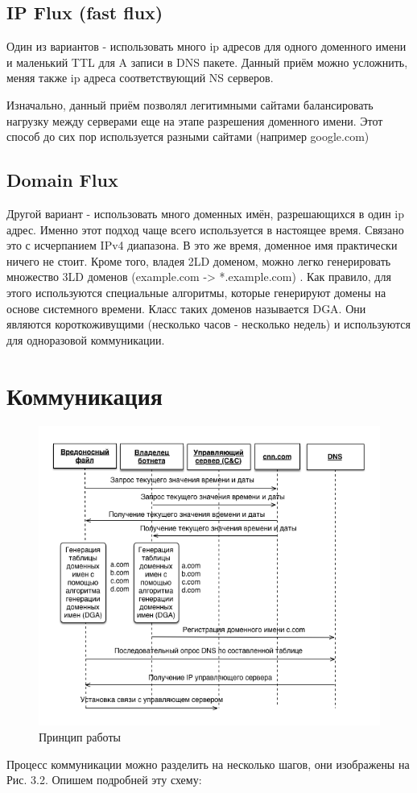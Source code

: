 \documentclass[14pt]{extreport} %
\begin{document}
\subsection{IP Flux (fast flux)}
Один из вариантов - использовать много ip адресов для одного доменного имени и маленький TTL для A записи в DNS пакете. Данный приём можно усложнить, меняя также ip адреса соответствующий NS серверов.
	
Изначально, данный приём позволял легитимными сайтами балансировать нагрузку между серверами еще на этапе разрешения доменного имени. Этот способ до сих пор используется разными сайтами (например google.com)
	
\subsection{Domain Flux}
Другой вариант - использовать много доменных имён, разрешающихся в один ip адрес. Именно этот подход чаще всего используется в настоящее время. Связано это с исчерпанием IPv4 диапазона. В это же время, доменное имя практически ничего не стоит. Кроме того, владея 2LD доменом, можно легко генерировать множество 3LD доменов (example.com -> *.example.com) .
Как правило, для этого используются специальные алгоритмы, которые генерируют домены на основе системного времени. Класс таких доменов называется DGA. Они являются короткоживущими (несколько часов - несколько недель) и используются для одноразовой коммуникации. 
	
\section{Коммуникация}
\begin{figure}[H]
	\centering
	\includegraphics[scale=0.8]{communicate.png}
	\caption{Принцип работы}
\end{figure}
Процесс коммуникации можно разделить на несколько шагов, они изображены на Рис. 3.2. Опишем подробней эту схему:
	
\end{document}
